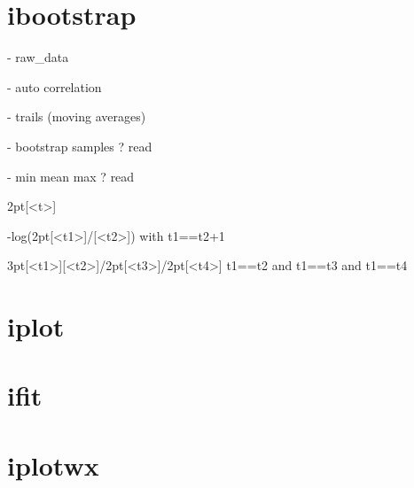 \documentclass[12pt]{article}
\begin{document}
\section{ibootstrap}

- raw_data

- auto correlation

- trails (moving averages)

- bootstrap samples ? read

- min mean max ? read

2pt[<t>]

-log(2pt[<t1>]/[<t2>]) with t1==t2+1

3pt[<t1>][<t2>]/2pt[<t3>]/2pt[<t4>] t1==t2 and t1==t3 and t1==t4



\section{iplot}

\section{ifit}

\section{iplotwx}
\end{document}
